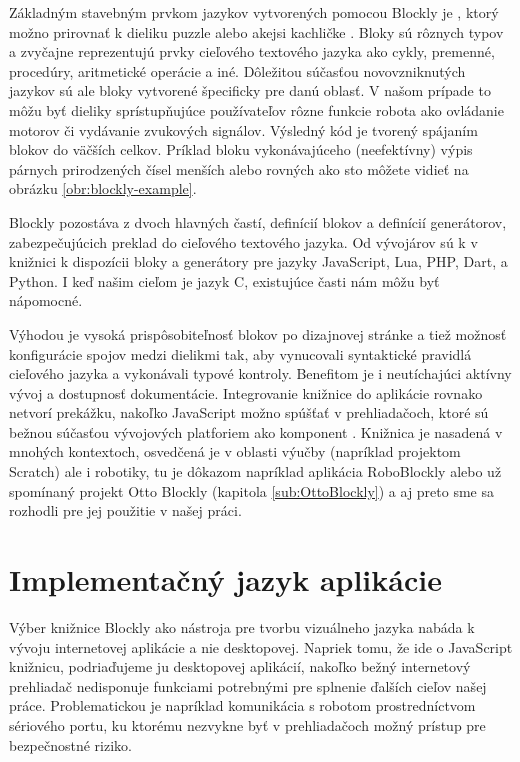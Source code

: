 Základným stavebným prvkom jazykov vytvorených pomocou Blockly je , ktorý možno prirovnať k dieliku puzzle alebo akejsi kachličke \cite{pasternak2017tips}. Bloky sú rôznych typov a zvyčajne reprezentujú prvky cieľového textového jazyka ako cykly, premenné, procedúry, aritmetické operácie a iné. Dôležitou súčasťou novovzniknutých jazykov sú ale bloky vytvorené špecificky pre danú oblasť. V našom prípade to môžu byť dieliky sprístupňujúce používateľov rôzne funkcie robota ako ovládanie motorov či vydávanie zvukových signálov. Výsledný kód je tvorený spájaním blokov do väčších celkov. Príklad bloku vykonávajúceho (neefektívny) výpis párnych prirodzených čísel menších alebo rovných ako sto môžete vidieť na obrázku \ref{obr:blockly-example}.

Blockly pozostáva z dvoch hlavných častí, definícií blokov a definícií generátorov, zabezpečujúcich preklad do cieľového textového jazyka. Od vývojárov sú k v knižnici k dispozícii  bloky a generátory pre jazyky JavaScript, Lua, PHP, Dart, a Python. I keď našim cieľom je jazyk C, existujúce časti nám môžu byť nápomocné.

Výhodou je vysoká prispôsobiteľnosť blokov po dizajnovej stránke a tiež možnosť konfigurácie spojov medzi dielikmi tak, aby vynucovali syntaktické pravidlá cieľového jazyka a vykonávali typové kontroly. Benefitom je i neutíchajúci aktívny vývoj a dostupnosť dokumentácie. Integrovanie knižnice do aplikácie rovnako netvorí prekážku, nakoľko JavaScript možno spúšťať v prehliadačoch, ktoré sú bežnou súčasťou vývojových platforiem ako komponent . Knižnica je nasadená v mnohých kontextoch, osvedčená je v oblasti výučby (napríklad projektom Scratch) ale i robotiky, tu je dôkazom napríklad aplikácia RoboBlockly alebo už spomínaný projekt Otto Blockly (kapitola \ref{sub:OttoBlockly}) a aj preto sme sa rozhodli pre jej použitie v našej práci.

\section{Implementačný jazyk aplikácie}
Výber knižnice Blockly ako nástroja pre tvorbu vizuálneho jazyka nabáda k vývoju internetovej aplikácie a nie desktopovej. Napriek tomu, že ide o JavaScript knižnicu, podriaďujeme ju desktopovej aplikácií, nakoľko bežný internetový prehliadač nedisponuje funkciami potrebnými pre splnenie ďalších cieľov našej práce. Problematickou je napríklad komunikácia s robotom prostredníctvom sériového portu, ku ktorému nezvykne byť v prehliadačoch možný prístup pre bezpečnostné riziko. 

